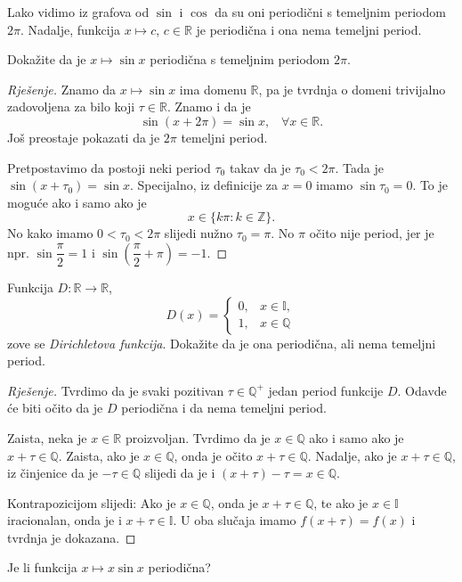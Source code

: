 Lako vidimo iz grafova od $\sin$ i $\cos$ da su oni periodični s temeljnim periodom $2\pi$. Nadalje, funkcija $x\mapsto c$, $c\in \mathbb{R}$ je periodična i ona nema temeljni period.
\begin{exercise}
Dokažite da je $x\mapsto \sin{x}$ periodična s temeljnim periodom $2\pi$.
\end{exercise}
\begin{proof}[Rješenje]
Znamo da $x\mapsto \sin{x}$ ima domenu $\mathbb{R}$, pa je tvrdnja o domeni trivijalno zadovoljena za bilo koji $\tau\in \mathbb{R}$. Znamo i da je $$\sin(x+2\pi)=\sin{x},\;\;\; \forall x\in \mathbb{R}.$$ Još preostaje pokazati da je $2\pi$ temeljni period. 

Pretpostavimo da postoji neki period $\tau_0$ takav da je $\tau_0<2\pi$. Tada je $\sin(x+\tau_0)=\sin{x}$. Specijalno, iz definicije za $x=0$ imamo $\sin{\tau_0}=0$. To je moguće ako i samo ako je $$x\in \{k\pi : k\in \mathbb{Z}\}.$$ No kako imamo $0<\tau_0<2\pi$ slijedi nužno $\tau_0=\pi$. No $\pi$ očito nije period, jer je npr. $\sin{\dfrac{\pi}{2}}=1$ i $\sin\left(\dfrac{\pi}{2}+\pi\right)=-1$.
\end{proof}
\begin{exercise}
Funkcija $D : \mathbb{R}\to \mathbb{R}$,
$$D(x)=\begin{cases}
0, & x\in \mathbb{I},\\
1, & x\in \mathbb{Q}
\end{cases}$$
zove se \textit{Dirichletova funkcija}. Dokažite da je ona periodična, ali nema temeljni period.
\end{exercise}
\begin{proof}[Rješenje]
Tvrdimo da je svaki pozitivan $\tau\in \mathbb{Q^+}$ jedan period funkcije $D$. Odavde će biti očito da je $D$ periodična i da nema temeljni period.

Zaista, neka je $x\in \mathbb{R}$ proizvoljan. Tvrdimo da je $x\in \mathbb{Q}$ ako i samo ako je $x+\tau\in \mathbb{Q}$. Zaista, ako je $x\in \mathbb{Q}$, onda je očito $x+\tau\in \mathbb{Q}$. Nadalje, ako je $x+\tau\in \mathbb{Q}$, iz činjenice da je $-\tau\in \mathbb{Q}$ slijedi da je i $(x+\tau)-\tau=x\in \mathbb{Q}$.

Kontrapozicijom slijedi: Ako je $x\in \mathbb{Q}$, onda je $x+\tau\in \mathbb{Q}$, te ako je $x\in \mathbb{I}$ iracionalan, onda je i $x+\tau\in \mathbb{I}$. U oba slučaja imamo $f(x+\tau)=f(x)$ i tvrdnja je dokazana.
\end{proof}
\begin{exercise}
Je li funkcija $x\mapsto x\sin{x}$ periodična?
\end{exercise}
